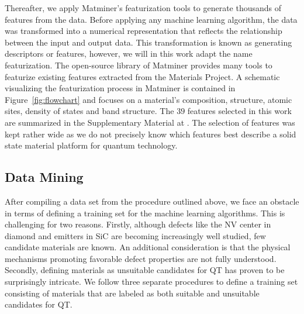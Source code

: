 \documentclass[superscriptaddress,unsortedaddress,
 amsmath,amssymb,
 aps,
]{revtex4-2}
\begin{document}
Thereafter, we apply Matminer’s \cite{Ward2018} featurization tools to generate thousands of features from the data. 
Before applying any machine learning algorithm, the data was transformed into a numerical representation that reflects the relationship between the input and output data. This transformation is known as generating descriptors 
or features, however, we will in this work adapt the name featurization. 
The open-source library of Matminer provides many tools to featurize existing features extracted from the Materials Project. 
A schematic visualizing the featurization process in Matminer is contained in Figure~\ref{fig:flowchart} 
and focuses on a material's composition,  structure, atomic sites, density of states and band structure. 
The $39$ features selected in this work are summarized in the Supplementary Material at \cite{supplementary}. The selection of features was kept rather wide as we do not precisely know which features best describe a solid state material platform for quantum technology. 

\subsection*{Data Mining}

After compiling a data set from the procedure outlined above, we face an obstacle in terms of defining a training set for the machine learning algorithms. This is challenging for two reasons. 
Firstly, although defects like the NV center in diamond and emitters in SiC are becoming
increasingly well studied, few candidate materials are known. An additional consideration 
is that the physical mechanisms promoting favorable defect properties are not fully understood. Secondly, defining materials as unsuitable candidates for QT has proven to be surprisingly intricate. 
We follow three separate procedures to define a training set consisting of materials that are labeled as both suitable and unsuitable candidates for QT. 
\end{document}
